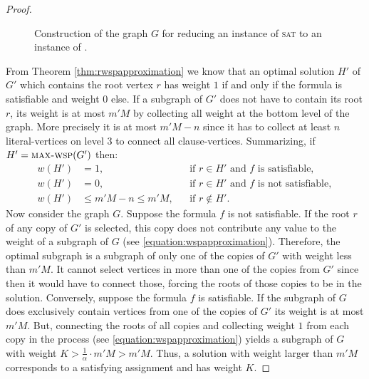 \begin{proof}
\begin{figure}[h]
{
		}%
		\caption{Construction of the graph $G$ for reducing an instance of \textsc{sat} to an instance of \maxWSP.}
		\label{fig:wspapproximation}
	\end{figure}
	
	From Theorem \ref{thm:rwspapproximation} we know that an optimal solution $H'$ of $G'$ which contains the root vertex $r$ has weight $1$ if and only if the formula is satisfiable and weight $0$ else.	If a subgraph of $G'$ does not have to contain its root $r$, its weight is at most $m'M$ by collecting all weight at the bottom level of the graph. More precisely it is at most $m'M - n$ since it has to collect at least $n$ literal-vertices on level $3$ to connect all clause-vertices. Summarizing, if $H' = \text{\textsc{max-wsp}}(G')$ then:
	\begin{equation}
		\label{equation:wspapproximation}
		\begin{aligned}
			w(H') &= 1,  && \text{if } r \in H' \text{ and } f \text{ is satisfiable},\\
			w(H') &= 0,  && \text{if } r \in H' \text{ and } f \text{ is not satisfiable},\\
			w(H') &\leq m'M - n \leq m'M,  && \text{if } r \notin H'.
		\end{aligned}
	\end{equation}
	Now consider the graph $G$. Suppose the formula $f$ is not satisfiable. If the root $r$ of any copy of $G'$ is selected, this copy does not contribute any value to the weight of a subgraph of $G$ (see \ref{equation:wspapproximation}). Therefore, the optimal subgraph is a subgraph of only one of the copies of $G'$ with weight less than $m'M$. It cannot select vertices in more than one of the copies from $G'$ since then it would have to connect those, forcing the roots of those copies to be in the solution. Conversely, suppose the formula $f$ is satisfiable. If the subgraph of $G$ does exclusively contain vertices from one of the copies of $G'$ its weight is at most $m'M$. But, connecting the roots of all copies and collecting weight $1$ from each copy in the process (see \ref{equation:wspapproximation}) yields a subgraph of $G$ with weight $K > \frac{1}{\alpha} \cdot m'M > m'M$. Thus, a solution with weight larger than $m'M$ corresponds to a satisfying assignment and has weight $K$.\medskip
	

\end{proof}
